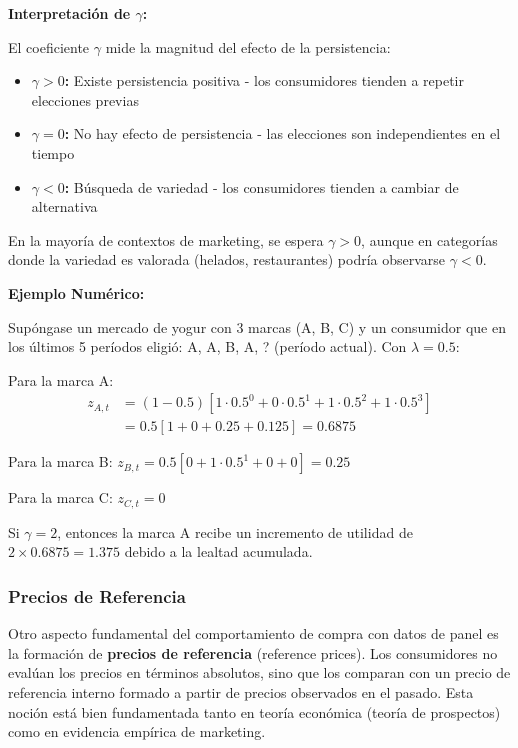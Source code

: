 \documentclass[
]{book}
\providecommand{\tightlist}{%
  \setlength{\itemsep}{0pt}\setlength{\parskip}{0pt}}
\begin{document}
\textbf{Interpretación de \(\gamma\):}

El coeficiente \(\gamma\) mide la magnitud del efecto de la persistencia:

\begin{itemize}
\tightlist
\item
  \textbf{\(\gamma > 0\):} Existe persistencia positiva - los consumidores tienden a repetir elecciones previas
\item
  \textbf{\(\gamma = 0\):} No hay efecto de persistencia - las elecciones son independientes en el tiempo
\item
  \textbf{\(\gamma < 0\):} Búsqueda de variedad - los consumidores tienden a cambiar de alternativa
\end{itemize}

En la mayoría de contextos de marketing, se espera \(\gamma > 0\), aunque en categorías donde la variedad es valorada (helados, restaurantes) podría observarse \(\gamma < 0\).

\textbf{Ejemplo Numérico:}

Supóngase un mercado de yogur con 3 marcas (A, B, C) y un consumidor que en los últimos 5 períodos eligió: A, A, B, A, ? (período actual). Con \(\lambda = 0.5\):

Para la marca A:
\[
\begin{aligned}
z_{A,t} &= (1-0.5)[1 \cdot 0.5^0 + 0 \cdot 0.5^1 + 1 \cdot 0.5^2 + 1 \cdot 0.5^3]\\
&= 0.5[1 + 0 + 0.25 + 0.125] = 0.6875
\end{aligned}
\]

Para la marca B: \(z_{B,t} = 0.5[0 + 1 \cdot 0.5^1 + 0 + 0] = 0.25\)

Para la marca C: \(z_{C,t} = 0\)

Si \(\gamma = 2\), entonces la marca A recibe un incremento de utilidad de \(2 \times 0.6875 = 1.375\) debido a la lealtad acumulada.

\subsubsection{Precios de Referencia}\label{precios-de-referencia}

Otro aspecto fundamental del comportamiento de compra con datos de panel es la formación de \textbf{precios de referencia} (reference prices). Los consumidores no evalúan los precios en términos absolutos, sino que los comparan con un precio de referencia interno formado a partir de precios observados en el pasado. Esta noción está bien fundamentada tanto en teoría económica (teoría de prospectos) como en evidencia empírica de marketing.
\end{document}
